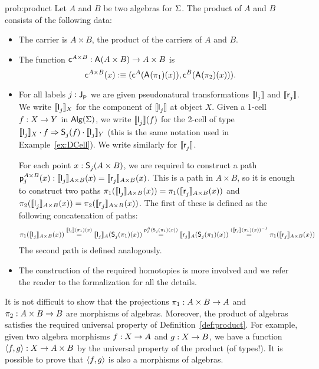 \begin{construction}{prob:product}\label{cons:product}
Let $A$ and $B$ be two algebras for $\Sigma$. The product of $A$ and
$B$ consists of the following data:
\begin{itemize}
\item The carrier is $A \times B$, the product of the carriers of $A$ and $B$.
\item The function $\mathsf{c}^{A \times B} : \mathsf{A}^{}(A \times B) \rightarrow A \times B$ is
\[
\mathsf{c}^{A \times B}(x) :\equiv (\mathsf{c}^{A}(\mathsf{A}^{}(\pi_1)(x)),\mathsf{c}^{B}(\mathsf{A}^{}(\pi_2)(x))).
\]
\item For all labels $j : \mathsf{J}^{}_{\mathsf{P}}$ we are given pseudonatural
transformations $\llbracket \mathsf{l}^{}_j \rrbracket$ and $\llbracket \mathsf{r}^{}_j \rrbracket$. We
write $\llbracket \mathsf{l}^{}_j \rrbracket_X$ for the component of $\llbracket \mathsf{l}^{}_j \rrbracket$
at object $X$. Given a
1-cell $f : X \rightarrow Y$ in $\mathsf{Alg}(\Sigma)$, we write
$\llbracket \mathsf{l}^{}_j \rrbracket(f)$ for the 2-cell of type
$\llbracket \mathsf{l}^{}_j \rrbracket_X \cdot
f \Rightarrow \mathsf{S}^{}_j(f) \cdot \llbracket \mathsf{l}^{}_j \rrbracket_Y$ (this is the same notation used in Example~\ref{ex:DCell}).
We write similarly for $\llbracket \mathsf{r}^{}_j \rrbracket$.

For each point $x : \mathsf{S}^{}_j(A \times B)$, we are required
to construct a path $\mathsf{p}^{A \times B}_{j}(x)
: \llbracket \mathsf{l}^{}_j \rrbracket_{A \times B}(x) = \llbracket \mathsf{r}^{}_j \rrbracket_{A \times
B}(x)$. This is a path in $A \times B$, so it is enough to construct
two paths $\pi_1(\llbracket \mathsf{l}^{}_j \rrbracket_{A \times B}(x))
= \pi_1(\llbracket \mathsf{r}^{}_j \rrbracket_{A \times B}(x))$ and
$\pi_2(\llbracket \mathsf{l}^{}_j \rrbracket_{A \times B}(x))
= \pi_2(\llbracket \mathsf{r}^{}_j \rrbracket_{A \times B}(x))$. The first of these is
defined as the following concatenation of paths:
\[
\pi_1(\llbracket \mathsf{l}^{}_j \rrbracket_{A \times B}(x))
\stackrel{\llbracket \mathsf{l}^{}_j \rrbracket(\pi_1)(x)}{=}
\llbracket \mathsf{l}^{}_j \rrbracket_{A}(\mathsf{S}^{}_j(\pi_1)(x)) 
\stackrel{\mathsf{p}^{A}_{j}(\mathsf{S}^{}_j(\pi_1)(x))}{=}
\llbracket \mathsf{r}^{}_j \rrbracket_{A}(\mathsf{S}^{}_j(\pi_1)(x)) 
\stackrel{(\llbracket \mathsf{r}^{}_j \rrbracket(\pi_1)(x))^{-1}}{=}
\pi_1(\llbracket \mathsf{r}^{}_j \rrbracket_{A \times B}(x))
\]
The second path is defined analogously.
\item The construction of the required homotopies is more involved and we refer the reader to the formalization for all the details.
\end{itemize}

It is not difficult to show that the projections $\pi_1 : A \times B \rightarrow A$ and $\pi_2 : A \times B \rightarrow B$ are morphisms of
algebras.  Moreover, the product of algebras satisfies the required
universal property of Definition~\ref{def:product}. For example, given
two algebra morphisms $f : X \rightarrow A$ and $g : X \rightarrow B$, we
have a function $\langle f , g \rangle : X \to A \times B$ by the universal
property of the product (of types!). It is possible to prove that
$\langle f , g \rangle$ is also a morphisms of algebras. 
\end{construction}


